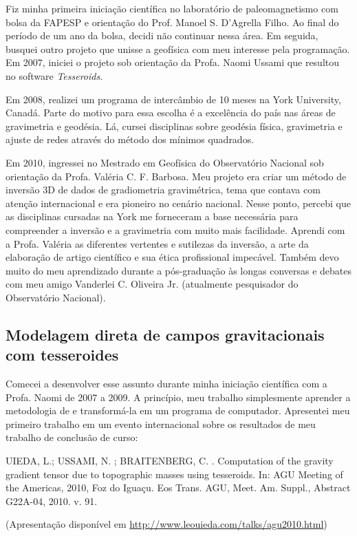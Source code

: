 Fiz minha primeira iniciação científica no laboratório de paleomagnetismo com
bolsa da FAPESP e orientação do Prof. Manoel S. D'Agrella Filho.
Ao final do período de um ano da bolsa, decidi não continuar nessa área.
Em seguida, busquei outro projeto que unisse a geofísica
com meu interesse pela programação.
Em 2007, iniciei o projeto sob orientação da
Profa. Naomi Ussami que resultou no software \textit{Tesseroids}.

Em 2008, realizei um programa de intercâmbio de 10 meses na York University,
Canadá.
Parte do motivo para essa escolha é a excelência do país nas áreas de
gravimetria e geodésia.
Lá, cursei disciplinas sobre geodésia física, gravimetria e ajuste de redes
através do método dos mínimos quadrados.

Em 2010, ingressei no Mestrado em Geofísica do Observatório Nacional sob
orientação da Profa. Valéria C. F. Barbosa.
Meu projeto era criar um método de inversão 3D de dados de gradiometria
gravimétrica, tema que contava com atenção internacional e era pioneiro no
cenário nacional.
Nesse ponto, percebi que as disciplinas cursadas na York me forneceram a base
necessária para compreender a inversão e a gravimetria com muito mais
facilidade.
Aprendi com a Profa. Valéria
as diferentes vertentes e sutilezas da inversão,
a arte da elaboração de artigo científico
e sua ética profissional impecável.
Também devo muito do meu aprendizado durante a pós-graduação às longas
conversas e debates com meu amigo Vanderlei C. Oliveira Jr. (atualmente
pesquisador do Observatório Nacional).



\subsection{Modelagem direta de campos gravitacionais com tesseroides}

Comecei a desenvolver esse assunto durante minha iniciação científica com a
Profa. Naomi de 2007 a 2009.
A princípio, meu trabalho simplesmente aprender a metodologia de
\citet{wild-pfeiffer2008} e transformá-la em um programa de computador.
Apresentei meu primeiro trabalho em um evento internacional sobre os resultados
de meu trabalho de conclusão de curso:

\begin{displayquote}
    UIEDA, L.; USSAMI, N. ; BRAITENBERG, C. . Computation of the gravity
    gradient tensor due to topographic masses using tesseroids. In: AGU Meeting
    of the Americas, 2010, Foz do Iguaçu. Eos Trans. AGU, Meet. Am. Suppl.,
    Abstract G22A-04, 2010. v. 91.

    (Apresentação disponível em
    \url{http://www.leouieda.com/talks/agu2010.html})
\end{displayquote}

